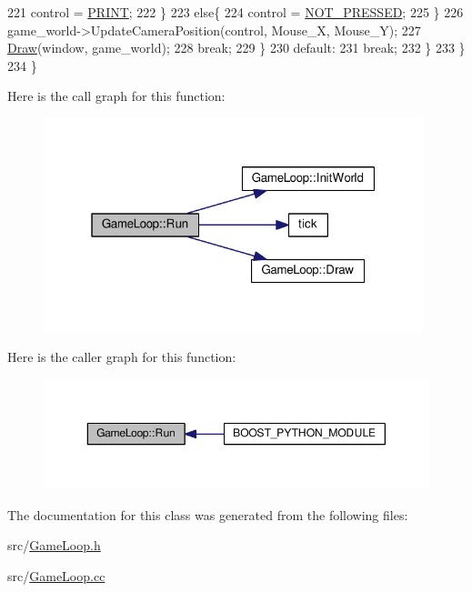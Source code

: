 \begin{DoxyCode}
221                 control = \hyperlink{common_8h_a0da83e35f29c11f7f3c637234f2149f9ab107229d44d042caa8ab8df4c8acaa1f}{PRINT};
222         \}
223         \textcolor{keywordflow}{else}\{
224             control = \hyperlink{common_8h_a0da83e35f29c11f7f3c637234f2149f9acdb8b9a398ffbd729218a27d00d8fa45}{NOT\_PRESSED};
225         \}
226       game\_world->UpdateCameraPosition(control, Mouse\_X, Mouse\_Y);
227       \hyperlink{class_game_loop_a5034124015cce5b8ecedae9f906b897b}{Draw}(window, game\_world);
228         \textcolor{keywordflow}{break};
229         \}
230       \textcolor{keywordflow}{default}:
231       \textcolor{keywordflow}{break};
232       \}
233   \}
234 \}
\end{DoxyCode}


Here is the call graph for this function\+:
\nopagebreak
\begin{figure}[H]
\begin{center}
\leavevmode
\includegraphics[width=313pt]{class_game_loop_a6d84f749fa38ca86039353245d77461c_cgraph}
\end{center}
\end{figure}




Here is the caller graph for this function\+:
\nopagebreak
\begin{figure}[H]
\begin{center}
\leavevmode
\includegraphics[width=350pt]{class_game_loop_a6d84f749fa38ca86039353245d77461c_icgraph}
\end{center}
\end{figure}




The documentation for this class was generated from the following files\+:\begin{DoxyCompactItemize}
\item 
src/\hyperlink{_game_loop_8h}{Game\+Loop.\+h}\item 
src/\hyperlink{_game_loop_8cc}{Game\+Loop.\+cc}\end{DoxyCompactItemize}
